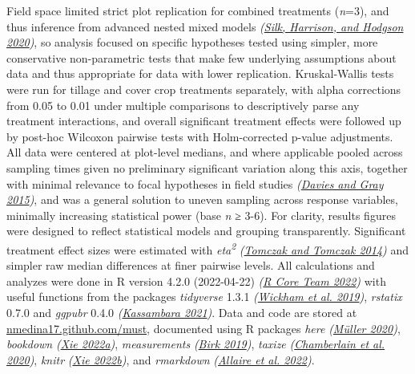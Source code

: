 \documentclass[
  12pt,
]{article}
\begin{document}
Field space limited strict plot replication for combined treatments (\emph{n}=3), and thus inference from advanced nested mixed models \emph{(\protect\hyperlink{ref-silk20}{Silk, Harrison, and Hodgson 2020})}, so analysis focused on specific hypotheses tested using simpler, more conservative non-parametric tests that make few underlying assumptions about data and thus appropriate for data with lower replication.
Kruskal-Wallis tests were run for tillage and cover crop treatments separately, with alpha corrections from 0.05 to 0.01 under multiple comparisons to descriptively parse any treatment interactions, and overall significant treatment effects were followed up by post-hoc Wilcoxon pairwise tests with Holm-corrected p-value adjustments.
All data were centered at plot-level medians, and where applicable pooled across sampling times given no preliminary significant variation along this axis, together with minimal relevance to focal hypotheses in field studies \emph{(\protect\hyperlink{ref-davies15b}{Davies and Gray 2015})}, and was a general solution to uneven sampling across response variables, minimally increasing statistical power (base \emph{n} ≥ 3-6).
For clarity, results figures were designed to reflect statistical models and grouping transparently.
Significant treatment effect sizes were estimated with \emph{eta\textsuperscript{2}} \emph{(\protect\hyperlink{ref-tomczak14}{Tomczak and Tomczak 2014})} and simpler raw median differences at finer pairwise levels.
All calculations and analyzes were done in R version 4.2.0 (2022-04-22) \emph{(\protect\hyperlink{ref-base}{R Core Team 2022})} with useful functions from the packages \emph{tidyverse} 1.3.1 \emph{(\protect\hyperlink{ref-tidyverse}{Wickham et al. 2019})}, \emph{rstatix} 0.7.0 and \emph{ggpubr} 0.4.0 \emph{(\protect\hyperlink{ref-rstatix}{Kassambara 2021})}.
Data and code are stored at \url{nmedina17.github.com/must},
documented using R packages \emph{here} \emph{(\protect\hyperlink{ref-here}{Müller 2020})}, \emph{bookdown} \emph{(\protect\hyperlink{ref-bookdown2022}{Xie 2022a})}, \emph{measurements} \emph{(\protect\hyperlink{ref-measurements}{Birk 2019})}, \emph{taxize} \emph{(\protect\hyperlink{ref-taxize2020}{Chamberlain et al. 2020})}, \emph{knitr} \emph{(\protect\hyperlink{ref-knitr2022}{Xie 2022b})}, and \emph{rmarkdown} \emph{(\protect\hyperlink{ref-rmarkdown2022}{Allaire et al. 2022})}.
\end{document}

